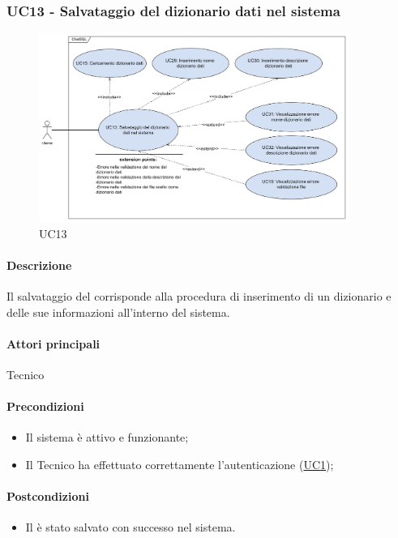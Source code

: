 \subsubsection{UC13 - Salvataggio del dizionario dati nel sistema}\label{UC13}

\begin{figure}[H]
  \centering
  \includegraphics[width=0.90\textwidth]{assets/uc13.png}
  \caption{UC13}
\end{figure}

\paragraph*{Descrizione}
Il salvataggio del  corrisponde alla procedura di inserimento di un dizionario e delle sue informazioni all'interno del sistema.

\paragraph*{Attori principali}
Tecnico

\paragraph*{Precondizioni}
\begin{itemize}
  \item Il sistema è attivo e funzionante;
  \item Il Tecnico ha effettuato correttamente l'autenticazione (\hyperref[UC1]{UC1});
\end{itemize}

\paragraph*{Postcondizioni}
\begin{itemize}
  \item Il  è stato salvato con successo nel sistema.
\end{itemize}

